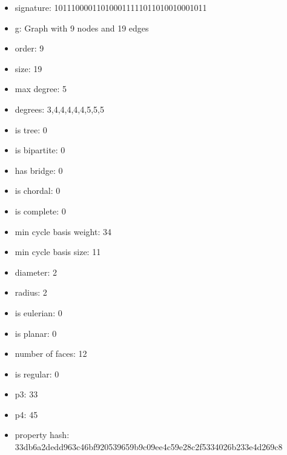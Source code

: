 \newpage
\begin{figure}
\end{figure}
\begin{itemize}
\item signature: 101110000110100011111011010010001011
\item g: Graph with 9 nodes and 19 edges
\item order: 9
\item size: 19
\item max degree: 5
\item degrees: 3,4,4,4,4,4,5,5,5
\item is tree: 0
\item is bipartite: 0
\item has bridge: 0
\item is chordal: 0
\item is complete: 0
\item min cycle basis weight: 34
\item min cycle basis size: 11
\item diameter: 2
\item radius: 2
\item is eulerian: 0
\item is planar: 0
\item number of faces: 12
\item is regular: 0
\item p3: 33
\item p4: 45
\item property hash: 33db6a2dedd963c46bf920539659b9c09ee4c59e28c2f5334026b233e4d269c8
\end{itemize}
